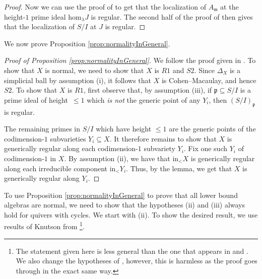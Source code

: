 \documentclass[ALCO,published]{cedram}
\numberwithin{equation}{section}
\newcommand{\1}{^{-1}}
\begin{document}
\begin{proof}
Now we can use the proof of \cite[Lemma 3.2]{BC03} to get that the localization of $A_{\mathfrak{m}}$ at the height-$1$ prime ideal $\textrm{hom}_\lambda J$ is regular. The second half of the proof of \cite[Proposition 3.1 (b)]{BC03} then gives that the localization of $S/I$ at $J$ is regular.
\end{proof}

We now prove Proposition \ref{prop:normalityInGeneral}.

\begin{proof}[Proof of Proposition \ref{prop:normalityInGeneral}]
We follow the proof given in \cite[Proposition 8.1]{KLS-Richardson}. 
To show that $X$ is normal, we need to show that $X$ is $R1$ and $S2$. Since $\Delta_X$ is a simplicial ball by assumption (i), it follows that $X$ is Cohen--Macaulay, and hence $S2$.
To show that $X$ is $R1$, first observe that, by assumption (iii), if $\mathfrak{p}\subseteq S/I$ is a prime ideal of height~$\leq 1$ which \emph{is not} the generic point of any $Y_i$, then $(S/I)_{\mathfrak{p}}$ is regular. 

The remaining primes in $S/I$ which have height $\leq 1$ are the generic points of the codimension-$1$ subvarieties $Y_i\subseteq X$.
It therefore remains to show that $X$ is generically regular along each codimension-$1$ subvariety $Y_i$. Fix one such $Y_i$ of codimension-$1$ in $X$.
By assumption (ii), we have that $\textrm{in}_< X$ is generically regular along each irreducible component $\textrm{in}_< Y_i$. Thus, by the lemma, we get that $X$ is generically regular along $Y_i$.
\end{proof}

To use Proposition \ref{prop:normalityInGeneral} to prove that all lower bound algebras are normal, we need to show that the hypotheses (ii) and (iii) always hold for quivers with cycles. We start with (ii). To show the desired result, we use results of Knutson from \cite{Knu09}\footnote{The statement given here is less general than the one that appears in \cite[Theorem 2]{Knu09} and \cite[Lemma 6]{Knu09}. We also change the hypotheses of \cite[Theorem 2]{Knu09}, however, this is harmless as the proof goes through in the exact same way.}. 
\end{document}
